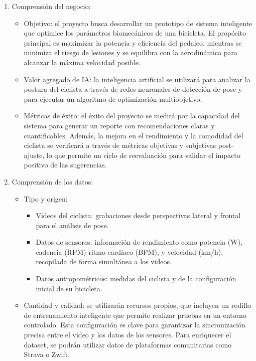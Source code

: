 \documentclass[
11pt, %
]{charter}
\begin{document}
\begin{enumerate}
  \item Comprensión del negocio:
    \begin{itemize}
      \item Objetivo: el proyecto busca desarrollar un prototipo de sistema inteligente que optimice los parámetros biomecánicos de una bicicleta. El propósito principal es maximizar la potencia y eficiencia del pedaleo, mientras se minimiza el riesgo de lesiones y se equilibra con la aerodinámica para alcanzar la máxima velocidad posible.
      \item Valor agregado de IA: la inteligencia artificial se utilizará para analizar la postura del ciclista a través de redes neuronales de detección de pose y para ejecutar un algoritmo de optimización multiobjetivo.
      \item Métricas de éxito: el éxito del proyecto se medirá por la capacidad del sistema para generar un reporte con recomendaciones claras y cuantificables. Además, la mejora en el rendimiento y la comodidad del ciclista se verificará a través de métricas objetivas y subjetivas post-ajuste, lo que permite un ciclo de reevaluación para validar el impacto positivo de las sugerencias.
    \end{itemize}

  \item Comprensión de los datos:
    \begin{itemize}
      \item Tipo y origen:
        \begin{itemize}
          \item Videos del ciclista: grabaciones desde perspectivas lateral y frontal para el análisis de pose.
          \item Datos de sensores: información de rendimiento como potencia (W), cadencia (RPM) ritmo cardíaco (BPM), y velocidad (km/h), recopilada de forma simultánea a los videos.
          \item Datos antropométricos: medidas del ciclista y de la configuración inicial de su bicicleta.
        \end{itemize}
      \item Cantidad y calidad: se utilizarán recursos propios, que incluyen un rodillo de entrenamiento inteligente que permite realizar pruebas en un entorno controlado. Esta configuración es clave para garantizar la sincronización precisa entre el video y los datos de los sensores. Para enriquecer el dataset, se podrán utilizar datos de plataformas comunitarias como Strava o Zwift.
    \end{itemize}


\end{enumerate}
\end{document}
